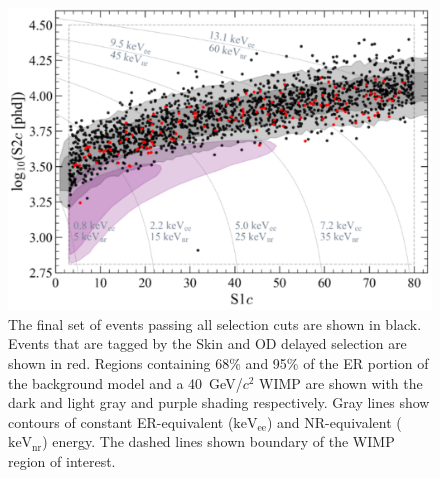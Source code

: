 \begin{figure}[ht!]
    \centering
    \includegraphics[width=0.7\linewidth]{figures/VetoEfficiency/WS2024VetoSideBandEvents_WIMP40.png}
    \caption{The final set of events passing all selection cuts are shown in black. Events that are tagged by the Skin and OD delayed selection are shown in red. Regions containing 68\% and 95\% of the ER portion of the background model and a 40~GeV/$c^2$ WIMP are shown with the dark and light gray and purple shading respectively. Gray lines show contours of constant ER-equivalent ($\text{keV}_\text{ee}$) and NR-equivalent ($\text{keV}_\text{nr}$) energy. The dashed lines shown boundary of the WIMP region of interest.}
    \label{fig:VetoEff/VetoSideBandEvents}
\end{figure}

